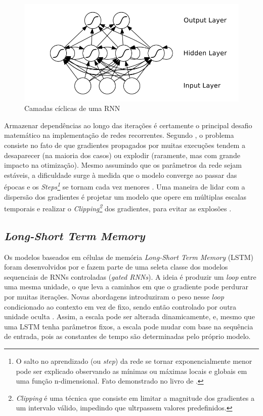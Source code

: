 \begin{figure}[!htb] \centering
  \caption{Camadas cíclicas de uma RNN} \label{figura:rnn}
  \begin{varwidth}{\linewidth}
    \includegraphics[width=12cm]{figuras/rnn.png}
  \end{varwidth}
\end{figure}

Armazenar dependências ao longo das iterações é certamente o principal desafio matemático na implementação de redes recorrentes.
Segundo \cite{graves}, o problema consiste no fato de que gradientes propagados por muitas execuções tendem a desaparecer (na maioria dos casos) ou explodir (raramente, mas com grande impacto na otimização).
Mesmo assumindo que os parâmetros da rede sejam estáveis, a dificuldade surge à medida que o modelo converge ao passar das épocas e os 
\textit{Steps\footnote{ O salto no aprendizado (ou \textit{step}) da rede se tornar exponencialmente menor pode ser explicado observando as mínimas ou máximas locais e globais em uma função n-dimensional. Fato demonstrado no livro de \textcite{stewart}.}} 
se tornam cada vez menores \cite{Good}.
Uma maneira de lidar com a dispersão dos gradientes é projetar um modelo que opere em múltiplas escalas temporais \cite{Bengio} e realizar o 
\textit{Clipping\footnote{\textit{Clipping} é uma técnica que consiste em limitar a magnitude dos gradientes a um intervalo válido, impedindo que ultrpassem valores predefinidos.}} dos gradientes, para evitar as explosões \cite{Exp}.

\subsection{\textit{Long-Short Term Memory}} \label{sec:lstm}
Os modelos baseados em células de memória \textit{Long-Short Term Memory} (LSTM) foram desenvolvidos por \textcite{Hoch} e fazem parte de uma seleta classe dos modelos sequenciais de RNNs controladas (\textit{gated RNNs}).
A ideia é produzir um \textit{loop} entre uma mesma unidade, o que leva a caminhos em que o gradiente pode perdurar por muitas iterações.
Novas abordagens introduziram o peso nesse \textit{loop} condicionado ao contexto em vez de fixo, sendo então controlado por outra unidade oculta \cite{Gers}. 
Assim, a escala pode ser alterada dinamicamente, e, 
 mesmo que uma LSTM tenha parâmetros fixos, a escala pode mudar com base na sequência 
de entrada, pois as constantes de tempo são determinadas pelo próprio modelo.

